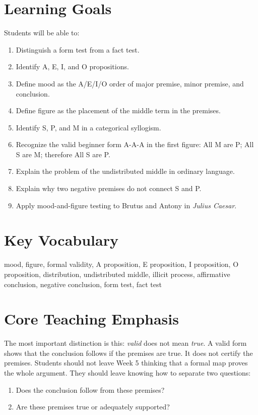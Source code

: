 \documentclass[12pt]{article}
\begin{document}
\section*{Learning Goals}
Students will be able to:
\begin{enumerate}[leftmargin=*]
\item Distinguish a form test from a fact test.
\item Identify A, E, I, and O propositions.
\item Define mood as the A/E/I/O order of major premise, minor premise, and conclusion.
\item Define figure as the placement of the middle term in the premises.
\item Identify S, P, and M in a categorical syllogism.
\item Recognize the valid beginner form A-A-A in the first figure: All M are P; All S are M; therefore All S are P.
\item Explain the problem of the undistributed middle in ordinary language.
\item Explain why two negative premises do not connect S and P.
\item Apply mood-and-figure testing to Brutus and Antony in \textit{Julius Caesar}.
\end{enumerate}

\section*{Key Vocabulary}
mood, figure, formal validity, A proposition, E proposition, I proposition, O proposition, distribution, undistributed middle, illicit process, affirmative conclusion, negative conclusion, form test, fact test

\section*{Core Teaching Emphasis}
The most important distinction is this: \textit{valid} does not mean \textit{true}. A valid form shows that the conclusion follows if the premises are true. It does not certify the premises. Students should not leave Week 5 thinking that a formal map proves the whole argument. They should leave knowing how to separate two questions:
\begin{enumerate}[leftmargin=*]
\item Does the conclusion follow from these premises?
\item Are these premises true or adequately supported?
\end{enumerate}
\end{document}

